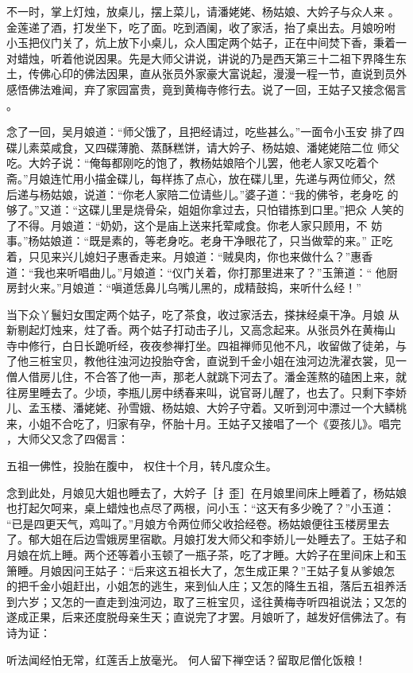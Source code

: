 不一时，掌上灯烛，放桌儿，摆上菜儿，请潘姥姥、杨姑娘、大妗子与众人来
。金莲递了酒，打发坐下，吃了面。吃到酒阑，收了家活，抬了桌出去。月娘吩咐
小玉把仪门关了，炕上放下小桌儿，众人围定两个姑子，正在中间焚下香，秉着一
对蜡烛，听着他说因果。先是大师父讲说，讲说的乃是西天第三十二祖下界降生东
土，传佛心印的佛法因果，直从张员外家豪大富说起，漫漫一程一节，直说到员外
感悟佛法难闻，弃了家园富贵，竟到黄梅寺修行去。说了一回，王姑子又接念偈言
。

念了一回，吴月娘道：“师父饿了，且把经请过，吃些甚么。”一面令小玉安
排了四碟儿素菜咸食，又四碟薄脆、蒸酥糕饼，请大妗子、杨姑娘、潘姥姥陪二位
师父吃。大妗子说：“俺每都刚吃的饱了，教杨姑娘陪个儿罢，他老人家又吃着个
斋。”月娘连忙用小描金碟儿，每样拣了点心，放在碟儿里，先递与两位师父，然
后递与杨姑娘，说道：“你老人家陪二位请些儿。”婆子道：“我的佛爷，老身吃
的够了。”又道：“这碟儿里是烧骨朵，姐姐你拿过去，只怕错拣到口里。”把众
人笑的了不得。月娘道：“奶奶，这个是庙上送来托荤咸食。你老人家只顾用，不
妨事。”杨姑娘道：“既是素的，等老身吃。老身干净眼花了，只当做荤的来。”
正吃着，只见来兴儿媳妇子惠香走来。月娘道：“贼臭肉，你也来做什么？”惠香
道：“我也来听唱曲儿。”月娘道：“仪门关着，你打那里进来了？”玉箫道：“
他厨房封火来。”月娘道：“嗔道恁鼻儿乌嘴儿黑的，成精鼓捣，来听什么经！”

当下众丫鬟妇女围定两个姑子，吃了茶食，收过家活去，搽抹经桌干净。月娘
从新剔起灯烛来，炷了香。两个姑子打动击子儿，又高念起来。从张员外在黄梅山
寺中修行，白日长跪听经，夜夜参禅打坐。四祖禅师见他不凡，收留做了徒弟，与
了他三桩宝贝，教他往浊河边投胎夺舍，直说到千金小姐在浊河边洗濯衣裳，见一
僧人借房儿住，不合答了他一声，那老人就跳下河去了。潘金莲熬的磕困上来，就
往房里睡去了。少顷，李瓶儿房中绣春来叫，说官哥儿醒了，也去了。只剩下李娇
儿、孟玉楼、潘姥姥、孙雪娥、杨姑娘、大妗子守着。又听到河中漂过一个大鳞桃
来，小姐不合吃了，归家有孕，怀胎十月。王姑子又接唱了一个《耍孩儿》。唱完
，大师父又念了四偈言：

五祖一佛性，投胎在腹中，
权住十个月，转凡度众生。

念到此处，月娘见大姐也睡去了，大妗子［扌歪］在月娘里间床上睡着了，杨姑娘
也打起欠呵来，桌上蜡烛也点尽了两根，问小玉：“这天有多少晚了？”小玉道：
“已是四更天气，鸡叫了。”月娘方令两位师父收拾经卷。杨姑娘便往玉楼房里去
了。郁大姐在后边雪娥房里宿歇。月娘打发大师父和李娇儿一处睡去了。王姑子和
月娘在炕上睡。两个还等着小玉顿了一瓶子茶，吃了才睡。大妗子在里间床上和玉
箫睡。月娘因问王姑子：“后来这五祖长大了，怎生成正果？”王姑子复从爹娘怎
的把千金小姐赶出，小姐怎的逃生，来到仙人庄；又怎的降生五祖，落后五祖养活
到六岁；又怎的一直走到浊河边，取了三桩宝贝，迳往黄梅寺听四祖说法；又怎的
遂成正果，后来还度脱母亲生天；直说完了才罢。月娘听了，越发好信佛法了。有
诗为证：

听法闻经怕无常，红莲舌上放毫光。
何人留下禅空话？留取尼僧化饭粮！